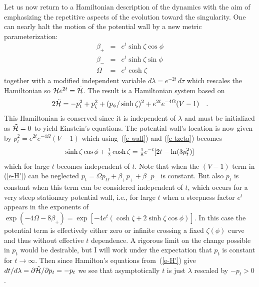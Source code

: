 \indent
Let us now return to a Hamiltonian description of the dynamics with
the aim of emphasizing the repetitive aspects of the evolution toward
the singularity.  One can nearly halt the motion of the potential wall
by a new metric parameterization:
\begin{eqnarray}
    \beta_+ & = & e^t \sinh\zeta \cos\phi \nonumber\\
    \beta_- & = & e^t \sinh\zeta \sin\phi \label{e-tzeta}\\
    \Omega  & = & e^t \cosh\zeta          \nonumber
\end{eqnarray}
together with a modified independent variable $d\lambda =
e^{-2t}\,d\tau$ which rescales the Hamiltonian so ${\cal H}e^{2t} =
\tilde{{\cal H}}$. The result is a Hamiltonian system based on
\begin{equation}\label{e-H'}
  2\tilde{{\cal H}} = -
  p_t^2 + p_\zeta^2 + (p_\phi / \sinh\zeta)^2
			    + e^{2t}e^{-4\Omega}(V-1) \quad .
\end{equation}
This Hamiltonian is conserved since it is independent of $\lambda$
and must be initialized as $\tilde{{\cal H}} = 0$ to yield
Einstein's equations.
The potential wall's location is now given by $p_t^2 =
e^{2t}e^{-4\Omega}(V-1)$ which using~(\ref{e-wall}) and
(\ref{e-tzeta}) becomes
\begin{equation}\label{e-wall'}
\sinh\zeta\cos\phi +
\mbox{$\frac{1}{2}$} \cosh\zeta = \mbox{$\frac{1}{8}$} e^{-t}[2t - \ln (3p_t^2)]
\end{equation}
which for large $t$ becomes independent of $t$.  Note that when the
$(V-1)$ term in (\ref{e-H'}) can be neglected $p_t = \Omega p_\Omega
+ \beta_+ p_+ + \beta_- p_-$ is constant.  But also $p_t$ is constant
when this term can be considered independent of $t$, which occurs for
a very steep stationary potential wall, i.e., for large $t$ when a
steepness factor $e^t$ appears in the exponents of
$\exp(-4\Omega-8\beta_+) = \exp[-4e^t(\cosh\zeta + 2\sinh\zeta
\cos\phi)]$.  In this case the potential term is effectively either
zero or infinite crossing a fixed $\zeta(\phi)$ curve and thus without
effective $t$ dependence.  A rigorous limit on the change possible in
$p_t$ would be desirable, but I will work under the expectation that
$p_t$ is constant for $t \rightarrow \infty$.  Then since Hamilton's
equations from~(\ref{e-H'}) give $dt/d\lambda = \partial\tilde{{\cal
H}}/\partial p_t = - p_t$ we see that asymptotically $t$ is
just $\lambda$ rescaled by $-p_t > 0$.


